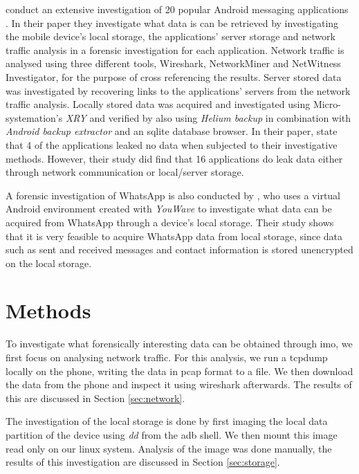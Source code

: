 \documentclass[conference]{IEEEtran}
\begin{document}
\citeauthor{walnycky2015network} conduct an extensive investigation of 20
popular Android messaging applications \cite{walnycky2015network}. In their
paper they investigate what data is can be retrieved by investigating the mobile
device's local storage, the applications' server storage and network traffic
analysis in a forensic investigation for each application. Network traffic is
analysed using three different tools, Wireshark, NetworkMiner and NetWitness
Investigator, for the purpose of cross referencing the results. Server stored
data was investigated by recovering links to the applications' servers from the
network traffic analysis. Locally stored data was acquired and investigated
using Micro-systemation's {\it XRY} and verified by also using {\it Helium
backup} in combination with {\it Android backup extractor} and an sqlite
database browser.  In their paper, \citeauthor{walnycky2015network} state that 4
of the applications leaked no data when subjected to their investigative
methods.  However, their study did find that 16 applications do leak data either
through network communication or local/server storage.

A forensic investigation of WhatsApp is also conducted by
\citeauthor{anglano2014forensic} \cite{anglano2014forensic}, who uses a virtual
Android environment created with {\it YouWave} to investigate what data can be
acquired from WhatsApp through a device's local storage. Their study shows that
it is very feasible to acquire WhatsApp data from local storage, since data such
as sent and received messages and contact information is stored unencrypted on
the local storage.


\section{Methods}\label{sec:method}

To investigate what forensically interesting data can be obtained through imo,
we first focus on analysing network traffic. For this analysis, we run a tcpdump
locally on the phone, writing the data in pcap format to a file. We then download
the data from the phone and inspect it using wireshark afterwards. The
results of this are discussed in Section \ref{sec:network}.

The investigation of the local storage is done by first imaging the local data
partition of the device using \textit{dd} from the adb shell. We then mount
this image read only on our linux system. Analysis of the image was done
manually, the results of this investigation are discussed in Section
\ref{sec:storage}.
\end{document}
